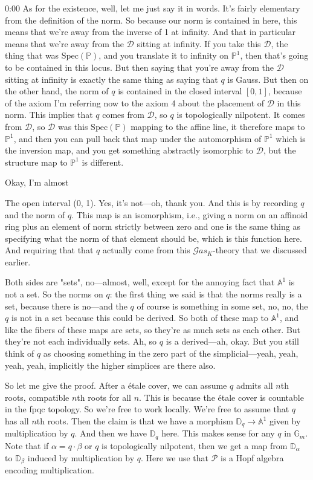 \begin{unfinished}{0:00}
As for the existence, well, let me just say it in words. It's fairly elementary from the definition of the norm. So because our norm is contained in here, this means that we're away from the inverse of 1 at infinity. And that in particular means that we're away from the $\mathcal{D}$ sitting at infinity. If you take this $\mathcal{D}$, the thing that was $\mathrm{Spec}(\mathbb{P})$, and you translate it to infinity on $\mathbb{P}^1$, then that's going to be contained in this locus. But then saying that you're away from the $\mathcal{D}$ sitting at infinity is exactly the same thing as saying that $q$ is Gauss. But then on the other hand, the norm of $q$ is contained in the closed interval $[0,1]$, because of the axiom I'm referring now to the axiom 4 about the placement of $\mathcal{D}$ in this norm. This implies that $q$ comes from $\mathcal{D}$, so $q$ is topologically nilpotent. It comes from $\mathcal{D}$, so $\mathcal{D}$ was this $\mathrm{Spec}(\mathbb{P})$ mapping to the affine line, it therefore maps to $\mathbb{P}^1$, and then you can pull back that map under the automorphism of $\mathbb{P}^1$ which is the inversion map, and you get something abstractly isomorphic to $\mathcal{D}$, but the structure map to $\mathbb{P}^1$ is different.

Okay, I'm almost

The open interval (0, 1). Yes, it's not---oh, thank you. And this is by recording $q$ and the norm of $q$. This map is an isomorphism, i.e., giving a norm on an affinoid ring plus an element of norm strictly between zero and one is the same thing as specifying what the norm of that element should be, which is this function here. And requiring that that $q$ actually come from this $\mathcal{G}as_{K}$-theory that we discussed earlier.

Both sides are "sets", no---almost, well, except for the annoying fact that $\mathbb{A}^{1}$ is not a set. So the norms on $q$: the first thing we said is that the norms really is a set, because there is no---and the $q$ of course is something in some set, no, no, the $q$ is not in a set because this could be derived. So both of these map to $\mathbb{A}^{1}$, and like the fibers of these maps are sets, so they're as much sets as each other. But they're not each individually sets. Ah, so $q$ is a derived---ah, okay. But you still think of $q$ as choosing something in the zero part of the simplicial---yeah, yeah, yeah, yeah, implicitly the higher simplices are there also.

So let me give the proof. After a \'{e}tale cover, we can assume $q$ admits all $n$th roots, compatible $n$th roots for all $n$. This is because the \'{e}tale cover is countable in the fpqc topology. So we're free to work locally. We're free to assume that $q$ has all $n$th roots. Then the claim is that we have a morphism $\mathbb{D}_{q} \to \mathbb{A}^{1}$ given by multiplication by $q$. And then we have $\mathbb{D}_{q}$ here. This makes sense for any $q$ in $\mathbb{G}_{m}$. Note that if $\alpha = q \cdot \beta$ or $q$ is topologically nilpotent, then we get a map from $\mathbb{D}_{\alpha}$ to $\mathbb{D}_{\beta}$ induced by multiplication by $q$. Here we use that $\mathcal{P}$ is a Hopf algebra encoding multiplication.


\end{unfinished}
